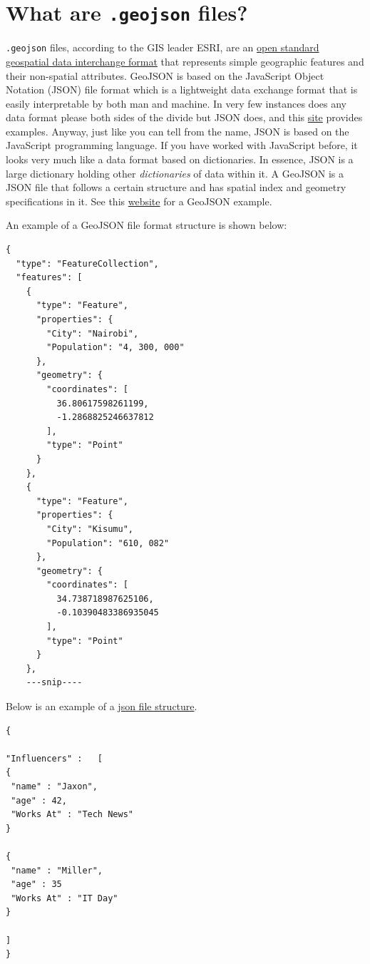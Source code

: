 \documentclass[
]{book}
\begin{document}
\hypertarget{what-are-.geojson-files}{%
\section{\texorpdfstring{What are \texttt{.geojson} files?}{What are .geojson files?}}\label{what-are-.geojson-files}}

\texttt{.geojson} files, according to the GIS leader ESRI, are an \href{https://doc.arcgis.com/en/arcgis-online/reference/geojson.htm}{open standard geospatial data interchange format} that represents simple geographic features and their non-spatial attributes. GeoJSON is based on the JavaScript Object Notation (JSON) file format which is a lightweight data exchange format that is easily interpretable by both man and machine. In very few instances does any data format please both sides of the divide but JSON does, and this \href{https://www.oracle.com/ke/database/what-is-json/}{site} provides examples. Anyway, just like you can tell from the name, JSON is based on the JavaScript programming language. If you have worked with JavaScript before, it looks very much like a data format based on dictionaries. In essence, JSON is a large dictionary holding other \emph{dictionaries} of data within it. A GeoJSON is a JSON file that follows a certain structure and has spatial index and geometry specifications in it. See this \href{https://datascience.aero/geospatial-data-representation-the-geojson-format/}{website} for a GeoJSON example.

An example of a GeoJSON file format structure is shown below:

\begin{verbatim}
{
  "type": "FeatureCollection",
  "features": [
    {
      "type": "Feature",
      "properties": {
        "City": "Nairobi",
        "Population": "4, 300, 000"
      },
      "geometry": {
        "coordinates": [
          36.80617598261199,
          -1.2868825246637812
        ],
        "type": "Point"
      }
    },
    {
      "type": "Feature",
      "properties": {
        "City": "Kisumu",
        "Population": "610, 082"
      },
      "geometry": {
        "coordinates": [
          34.738718987625106,
          -0.10390483386935045
        ],
        "type": "Point"
      }
    },
    ---snip----
\end{verbatim}

Below is an example of a \href{https://www.oracle.com/ke/database/what-is-json/}{json file structure}.

\begin{verbatim}
{

"Influencers" :   [ 
{
 "name" : "Jaxon", 
 "age" : 42, 
 "Works At" : "Tech News"
}

{
 "name" : "Miller", 
 "age" : 35
 "Works At" : "IT Day"
}

] 
}
\end{verbatim}
\end{document}
